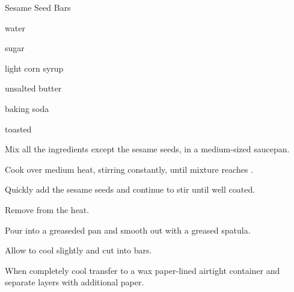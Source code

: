 \begin{recipe}{Sesame Seed Bars}{}{}

\begin{ingredients}
\item {} water
\item {} sugar
\item {} light corn syrup
\item {} unsalted butter
\item \tp{\quarter} baking soda
\item {} toasted 
\end{ingredients}

\begin{directions}
\item Mix all the ingredients except the sesame seeds, in a medium-sized saucepan.
\item Cook over medium heat, stirring constantly, until mixture reaches .
\item Quickly add the sesame seeds and continue to stir until well coated.
\item Remove from the heat.
\item Pour into a greaseded pan and smooth out with a greased spatula.
\item Allow to cool slightly and cut into bars.
\item When completely cool transfer to a wax paper-lined airtight container and separate layers with additional paper.
\end{directions}
\end{recipe}
